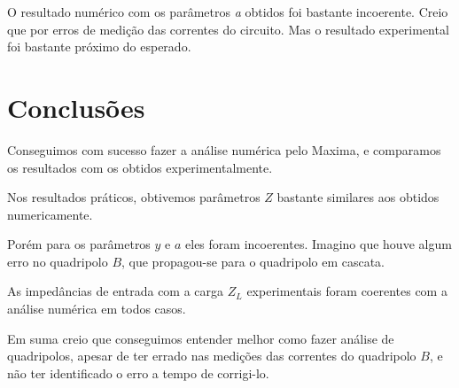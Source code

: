 \documentclass[12pt,twoside, a4paper, twocolumn]{article}
\begin{document}
O resultado numérico com os parâmetros \emph{a} obtidos foi bastante incoerente. Creio que por erros de medição das correntes do circuito. Mas o resultado experimental foi bastante próximo do esperado.




\section{Conclusões}


Conseguimos com sucesso fazer a análise numérica pelo Maxima, e comparamos os resultados com os obtidos experimentalmente.




Nos resultados práticos, obtivemos parâmetros $Z$ bastante similares aos obtidos numericamente.


Porém para os parâmetros $y$ e $a$ eles foram incoerentes. Imagino que houve algum erro no quadripolo $B$, que propagou-se para o quadripolo em cascata.


As impedâncias de entrada com a carga $Z_L$ experimentais foram coerentes com a análise numérica em todos casos.


Em suma creio que conseguimos entender melhor como fazer análise de quadripolos, apesar de ter errado nas medições das correntes do quadripolo $B$, e não ter identificado o erro a tempo de corrigi-lo.
\end{document}
